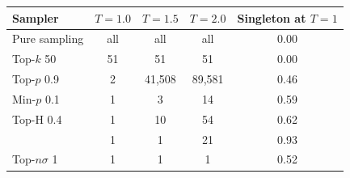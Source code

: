 \begin{tabular}{lcccc}
\toprule
Sampler & $T{=}1.0$ & $T{=}1.5$ & $T{=}2.0$ & Singleton at $T{=}1$ \\
\midrule
Pure sampling & all & all & all & 0.00 \\
Top-$k$ 50 & 51 & 51 & 51 & 0.00 \\
Top-$p$ 0.9 & 2 & 41,508 & 89,581 & 0.46 \\
Min-$p$ 0.1 & 1 & 3 & 14 & 0.59 \\
Top-H 0.4 & 1 & 10 & 54 & 0.62 \\
\pless{} & 1 & 1 & 21 & 0.93 \\
Top-$n\sigma$ 1 & 1 & 1 & 1 & 0.52 \\
\bottomrule
\end{tabular}
